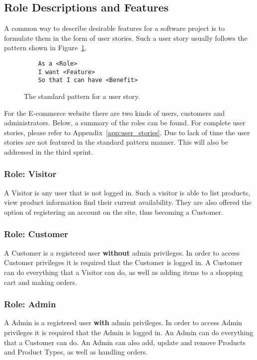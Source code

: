 \subsection{Role Descriptions and Features}

A common way to describe desirable features for a software project is to
formulate them in the form of user stories. Such a user story usually follows
the pattern shown in Figure~\ref{fig:user_story}.



\begin{figure}[H]
  \centering
  \begin{verbatim}
    As a <Role>
    I want <Feature>
    So that I can have <Benefit>
  \end{verbatim}
  \caption{\label{fig:user_story} The standard pattern for a user story.}
\end{figure}



For the E-commerce website there are two kinds of users, customers and
administrators. Below, a summary of the roles can be found. For complete user
stories, please refer to Appendix~\ref{app:user_stories}. Due to lack of time the user stories are not featured in the standard pattern manner. This will also be addressed in the third sprint. 

\subsubsection{Role: Visitor}\label{sec:visitor_role}

A Visitor is any user that is not logged in. Such a visitor is able to list
products, view product information find their current availability. They are
also offered the option of registering an account on the site, thus becoming
a Customer.

\subsubsection{Role: Customer}\label{sec:user_role}

A Customer is a registered user \textbf{without} admin privileges. In order to
access Customer privileges it is required that the Customer is logged in.
A Customer can do everything that a Visitor can do, as well as adding items
to a shopping cart and making orders.

\subsubsection{Role: Admin}\label{sec:admin_role}

A Admin is a registered user \textbf{with} admin privileges. In order to access
Admin privileges it is required that the Admin is logged in. An Admin can do
everything that a Customer can do. An Admin can also add, update and remove
Products and Product Types, as well as handling orders.
